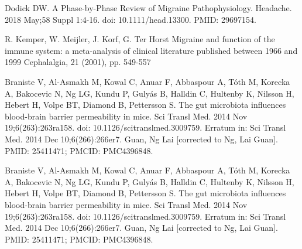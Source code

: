 \documentclass{article}
\begin{document}
\begin{thebibliography}{9}
Dodick DW. A Phase-by-Phase Review of Migraine Pathophysiology. Headache. 2018 May;58 Suppl 1:4-16. doi: 10.1111/head.13300. PMID: 29697154.

R. Kemper, W. Meijler, J. Korf, G. Ter Horst
Migraine and function of the immune system: a meta-analysis of clinical literature published between 1966 and 1999
Cephalalgia, 21 (2001), pp. 549-557

Braniste V, Al-Asmakh M, Kowal C, Anuar F, Abbaspour A, Tóth M, Korecka A, Bakocevic N, Ng LG, Kundu P, Gulyás B, Halldin C, Hultenby K, Nilsson H, Hebert H, Volpe BT, Diamond B, Pettersson S. The gut microbiota influences blood-brain barrier permeability in mice. Sci Transl Med. 2014 Nov 19;6(263):263ra158. doi: 10.1126/scitranslmed.3009759. Erratum in: Sci Transl Med. 2014 Dec 10;6(266):266er7. Guan, Ng Lai [corrected to Ng, Lai Guan]. PMID: 25411471; PMCID: PMC4396848.

Braniste V, Al-Asmakh M, Kowal C, Anuar F, Abbaspour A, Tóth M, Korecka A, Bakocevic N, Ng LG, Kundu P, Gulyás B, Halldin C, Hultenby K, Nilsson H, Hebert H, Volpe BT, Diamond B, Pettersson S. The gut microbiota influences blood-brain barrier permeability in mice. Sci Transl Med. 2014 Nov 19;6(263):263ra158. doi: 10.1126/scitranslmed.3009759. Erratum in: Sci Transl Med. 2014 Dec 10;6(266):266er7. Guan, Ng Lai [corrected to Ng, Lai Guan]. PMID: 25411471; PMCID: PMC4396848.

\end{thebibliography}
\end{document}
